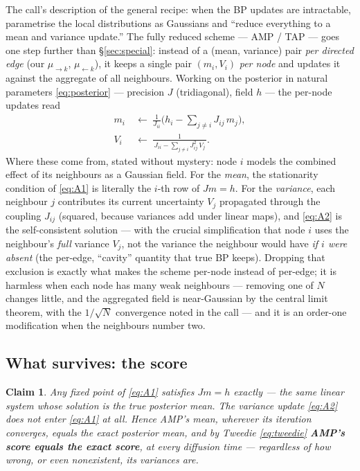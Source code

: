 \documentclass[11pt]{article}
\newtheorem{claim}{Claim}
\theoremstyle{definition}
\theoremstyle{remark}
\begin{document}
The call's description of the general recipe: when the BP updates are
intractable, parametrise the local distributions as Gaussians and ``reduce
everything to a mean and variance update.'' The fully reduced scheme --- AMP
/ TAP --- goes one step further than \S\ref{sec:special}: instead of a
(mean, variance) pair \emph{per directed edge} (our $\mu_{\to k}$,
$\mu_{\leftarrow k}$), it keeps a single pair $(m_i,V_i)$ \emph{per node}
and updates it against the aggregate of all neighbours. Working on the
posterior in natural parameters \eqref{eq:posterior} --- precision $J$
(tridiagonal), field $h$ --- the per-node updates read
\begin{align}
  m_i\ &\leftarrow\
  \frac{1}{J_{ii}}\Big(h_i-\sum_{j\neq i}J_{ij}\,m_j\Big),
  \tag{A1}\label{eq:A1}\\[2pt]
  V_i\ &\leftarrow\
  \frac{1}{\,J_{ii}-\sum_{j\neq i}J_{ij}^2\,V_j\,}.
  \tag{A2}\label{eq:A2}
\end{align}
Where these come from, stated without mystery: node $i$ models the combined
effect of its neighbours as a Gaussian field. For the \emph{mean}, the
stationarity condition of \eqref{eq:A1} is literally the $i$-th row of
$Jm=h$. For the \emph{variance}, each neighbour $j$ contributes its current
uncertainty $V_j$ propagated through the coupling $J_{ij}$ (squared,
because variances add under linear maps), and \eqref{eq:A2} is the
self-consistent solution --- with the crucial simplification that node $i$
uses the neighbour's \emph{full} variance $V_j$, not the variance the
neighbour would have \emph{if $i$ were absent} (the per-edge, ``cavity''
quantity that true BP keeps). Dropping that exclusion is exactly what makes
the scheme per-node instead of per-edge; it is harmless when each node has
many weak neighbours --- removing one of $N$ changes little, and the
aggregated field is near-Gaussian by the central limit theorem, with the
$1/\sqrt N$ convergence noted in the call --- and it is an order-one
modification when the neighbours number two.

\subsection{What survives: the score}

\begin{claim}\label{claim:samescore}
Any fixed point of \eqref{eq:A1} satisfies $Jm=h$ exactly --- the same
linear system whose solution is the true posterior mean. The variance
update \eqref{eq:A2} does not enter \eqref{eq:A1} at all. Hence AMP's mean,
wherever its iteration converges, equals the exact posterior mean, and by
Tweedie \eqref{eq:tweedie} \textbf{AMP's score equals the exact score}, at
every diffusion time --- regardless of how wrong, or even nonexistent, its
variances are.
\end{claim}
\end{document}

